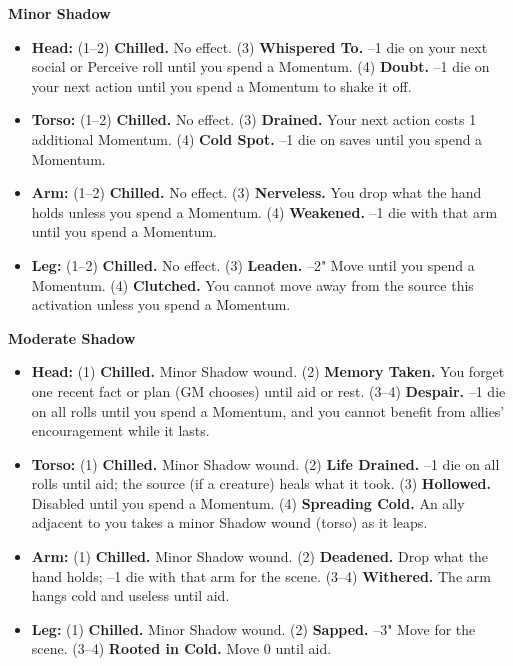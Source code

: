 \textbf{Minor Shadow}
\begin{itemize}
    \item \textbf{Head:} (1--2) \textbf{Chilled.} No effect. (3) \textbf{Whispered To.} --1 die on your next social or Perceive roll until you spend a Momentum. (4) \textbf{Doubt.} --1 die on your next action until you spend a Momentum to shake it off.
    \item \textbf{Torso:} (1--2) \textbf{Chilled.} No effect. (3) \textbf{Drained.} Your next action costs 1 additional Momentum. (4) \textbf{Cold Spot.} --1 die on saves until you spend a Momentum.
    \item \textbf{Arm:} (1--2) \textbf{Chilled.} No effect. (3) \textbf{Nerveless.} You drop what the hand holds unless you spend a Momentum. (4) \textbf{Weakened.} --1 die with that arm until you spend a Momentum.
    \item \textbf{Leg:} (1--2) \textbf{Chilled.} No effect. (3) \textbf{Leaden.} --2" Move until you spend a Momentum. (4) \textbf{Clutched.} You cannot move away from the source this activation unless you spend a Momentum.
\end{itemize}

\textbf{Moderate Shadow}
\begin{itemize}
    \item \textbf{Head:} (1) \textbf{Chilled.} Minor Shadow wound. (2) \textbf{Memory Taken.} You forget one recent fact or plan (GM chooses) until aid or rest. (3--4) \textbf{Despair.} --1 die on all rolls until you spend a Momentum, and you cannot benefit from allies' encouragement while it lasts.
    \item \textbf{Torso:} (1) \textbf{Chilled.} Minor Shadow wound. (2) \textbf{Life Drained.} --1 die on all rolls until aid; the source (if a creature) heals what it took. (3) \textbf{Hollowed.} Disabled until you spend a Momentum. (4) \textbf{Spreading Cold.} An ally adjacent to you takes a minor Shadow wound (torso) as it leaps.
    \item \textbf{Arm:} (1) \textbf{Chilled.} Minor Shadow wound. (2) \textbf{Deadened.} Drop what the hand holds; --1 die with that arm for the scene. (3--4) \textbf{Withered.} The arm hangs cold and useless until aid.
    \item \textbf{Leg:} (1) \textbf{Chilled.} Minor Shadow wound. (2) \textbf{Sapped.} --3" Move for the scene. (3--4) \textbf{Rooted in Cold.} Move 0 until aid.
\end{itemize}

